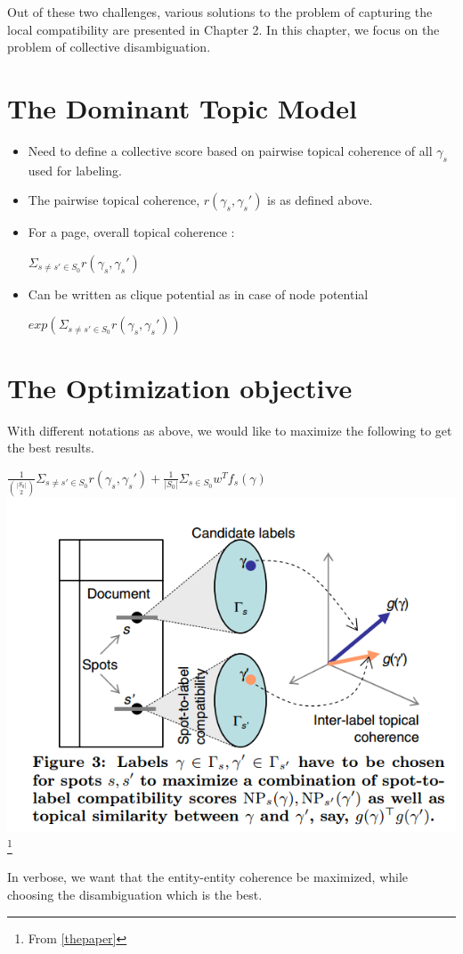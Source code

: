  Out of these two challenges, various solutions to the problem of capturing the local compatibility are presented in Chapter 2. 
 In this chapter, we focus on the problem of collective disambiguation. 
 
 \section{The Dominant Topic Model}
  \begin{itemize}
   \item Need to define a collective score based on pairwise topical coherence of all $\gamma_s$ used for labeling. \medskip
   \item The pairwise topical coherence, $r(\gamma_s, \gamma_s')$ is as defined above.\medskip
   \item For a page, overall topical coherence : \begin{center}\medskip
                                                  $\Sigma_{s \neq s' \in S_0}r(\gamma_s, \gamma_s')$
                                                 \end{center}
   \item Can be written as clique potential as in case of node potential\medskip
      \begin{center}
	$exp(\Sigma_{s \neq s' \in S_0}r(\gamma_s, \gamma_s'))$
      \end{center}

  \end{itemize}

  \section{The Optimization objective}
  With different notations as above, we would like to maximize the following to get the 
  best results.
 \begin{center}
 $\frac{1}{\binom{|S_0|}{2}}\Sigma_{s \neq s' \in S_0}r(\gamma_s, \gamma_s') + \frac{1}{|S_0|}\Sigma_{s \in S_0}w^{T}f_s(\gamma)$
  \\
  \includegraphics[height = 5 cm]{objective}\footnote{From \ref{thepaper}}
  \end{center}
  In verbose, we want that the entity-entity coherence be maximized, while choosing the disambiguation which is the best.

